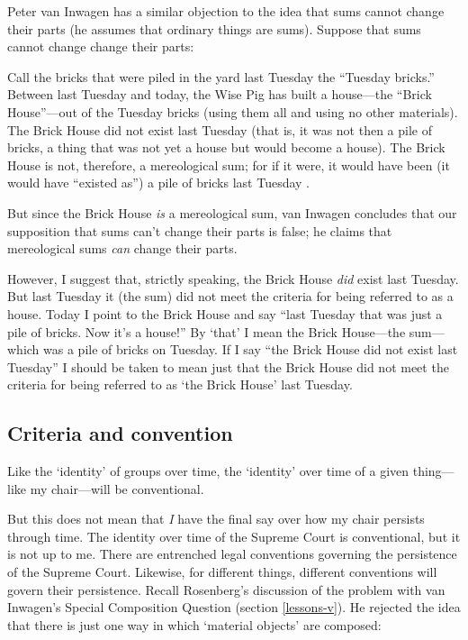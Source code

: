 \documentclass[11pt]{article}
\newenvironment{squote}{%
\begin{spacing}{1}
\begin{list}{}{%
\setlength{\labelwidth}{0pt}%
\rightmargin\leftmargin%
}
\item\relax
}{%
\end{list}%
\end{spacing}
}
\begin{document}
\begin{spacing}{1.5}
Peter van Inwagen has a similar objection to the idea that sums cannot
change their parts (he assumes that ordinary things are sums).
Suppose that sums cannot change change their parts:

\begin{squote}
Call the bricks that were piled in the yard last Tuesday the ``Tuesday
bricks.''  Between last Tuesday and today, the Wise Pig has built a
house---the ``Brick House''---out of the Tuesday bricks (using them
all and using no other materials).  The Brick House did not exist last
Tuesday (that is, it was not then a pile of bricks, a thing that was
not yet a house but would become a house).  The Brick House is not,
therefore, a mereological sum; for if it were, it would have been (it
would have ``existed as'') a pile of bricks last Tuesday
\citeyearpar[616]{inwagen2006}.
\end{squote}

But since the Brick House {\em is} a mereological sum, van Inwagen
concludes that our supposition that sums can't change their parts is
false; he claims that mereological sums {\em can} change their parts.

However, I suggest that, strictly speaking, the Brick House {\em did}
exist last Tuesday.  But last Tuesday it (the sum) did not meet the
criteria for being referred to as a house.  Today I point to the Brick
House and say ``last Tuesday that was just a pile of bricks.  Now it's
a house!''  By `that' I mean the Brick House---the sum---which was a
pile of bricks on Tuesday.  If I say ``the Brick House did not exist
last Tuesday'' I should be taken to mean just that the Brick House did
not meet the criteria for being referred to as `the Brick House' last
Tuesday.

\subsection{Criteria and convention}
\label{criteria}
Like the `identity' of groups over time, the `identity' over time of a
given thing---like my chair---will be conventional.

But this does not mean that {\em I} have the final say over how my
chair persists through time.  The identity over time of the Supreme
Court is conventional, but it is not up to me.  There are entrenched
legal conventions governing the persistence of the Supreme Court.
Likewise, for different things, different conventions will govern
their persistence.  Recall Rosenberg's discussion of the problem with
van Inwagen's Special Composition Question (section \ref{lessons-v}).
He rejected the idea that there is just one way in which `material
objects' are composed:


\end{spacing}
\end{document}
